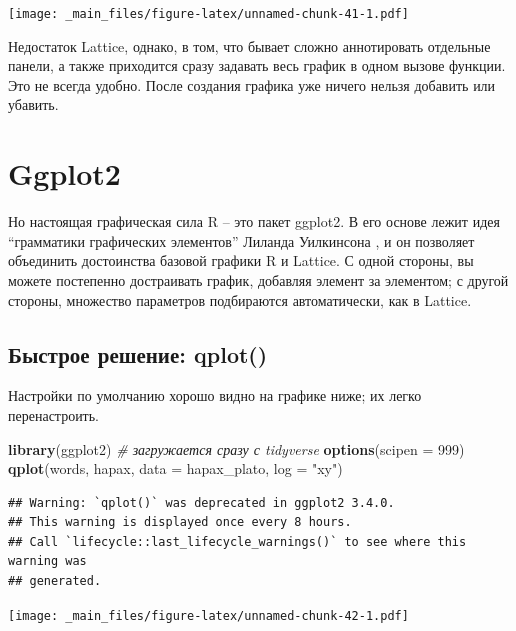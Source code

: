 \documentclass[
]{book}
\newenvironment{Shaded}{\begin{snugshade}}{\end{snugshade}}
\newcommand{\AttributeTok}[1]{\textcolor[rgb]{0.13,0.29,0.53}{#1}}
\newcommand{\CommentTok}[1]{\textcolor[rgb]{0.56,0.35,0.01}{\textit{#1}}}
\newcommand{\DecValTok}[1]{\textcolor[rgb]{0.00,0.00,0.81}{#1}}
\newcommand{\FunctionTok}[1]{\textcolor[rgb]{0.13,0.29,0.53}{\textbf{#1}}}
\newcommand{\NormalTok}[1]{#1}
\newcommand{\StringTok}[1]{\textcolor[rgb]{0.31,0.60,0.02}{#1}}
\theoremstyle{definition}
\theoremstyle{definition}
\theoremstyle{definition}
\theoremstyle{definition}
\theoremstyle{remark}
\begin{document}
\texttt{[image: \_main\_files/figure-latex/unnamed-chunk-41-1.pdf]}

Недостаток Lattice, однако, в том, что бывает сложно аннотировать отдельные панели, а также приходится сразу задавать весь график в одном вызове функции. Это не всегда удобно. После создания графика уже ничего нельзя добавить или убавить.

\hypertarget{ggplot2}{%
\section{Ggplot2}\label{ggplot2}}

Но настоящая графическая сила R -- это пакет ggplot2. В его основе лежит идея ``грамматики графических элементов'' Лиланда Уилкинсона \citep{мастицкий2017}, и он позволяет объединить достоинства базовой графики R и Lattice. С одной стороны, вы можете постепенно достраивать график, добавляя элемент за элементом; с другой стороны, множество параметров подбираются автоматически, как в Lattice.

\hypertarget{ux431ux44bux441ux442ux440ux43eux435-ux440ux435ux448ux435ux43dux438ux435-qplot}{%
\subsection{Быстрое решение: qplot()}\label{ux431ux44bux441ux442ux440ux43eux435-ux440ux435ux448ux435ux43dux438ux435-qplot}}

Настройки по умолчанию хорошо видно на графике ниже; их легко перенастроить.

\begin{Shaded}
\begin{Highlighting}[]
\FunctionTok{library}\NormalTok{(ggplot2) }\CommentTok{\# загружается сразу с tidyverse}
\FunctionTok{options}\NormalTok{(}\AttributeTok{scipen =} \DecValTok{999}\NormalTok{)}
\FunctionTok{qplot}\NormalTok{(words, hapax, }\AttributeTok{data =}\NormalTok{ hapax\_plato, }\AttributeTok{log =} \StringTok{"xy"}\NormalTok{)}
\end{Highlighting}
\end{Shaded}

\begin{verbatim}
## Warning: `qplot()` was deprecated in ggplot2 3.4.0.
## This warning is displayed once every 8 hours.
## Call `lifecycle::last_lifecycle_warnings()` to see where this warning was
## generated.
\end{verbatim}

\texttt{[image: \_main\_files/figure-latex/unnamed-chunk-42-1.pdf]}
\end{document}
